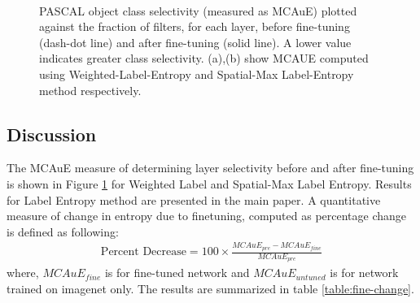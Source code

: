 \begin{figure}[t!]
\centering
{} \\
\caption{PASCAL object class selectivity (measured as MCAuE) plotted against the fraction of filters, for each layer, before fine-tuning (dash-dot line) and after fine-tuning (solid line). A lower value indicates greater class selectivity. (a),(b) show MCAUE computed using Weighted-Label-Entropy and Spatial-Max Label-Entropy method respectively.}
\label{fig:fine-entropy}
\end{figure}

\subsection{Discussion}
The MCAuE measure of determining layer selectivity before and after fine-tuning is shown in Figure \ref{fig:fine-entropy} for Weighted Label and Spatial-Max Label Entropy. Results for Label Entropy method are presented in the main paper. A quantitative measure of change in entropy due to finetuning, computed as percentage change is defined as following:
\begin{eqnarray}
\text{Percent Decrease} = 100 \times \frac{MCAuE_{pre} - MCAuE_{fine}}{MCAuE_{pre}}
\end{eqnarray}
where, $MCAuE_{fine}$ is for fine-tuned network and $MCAuE_{untuned}$ is for network trained on imagenet only. The results are summarized in table \ref{table:fine-change}.
 

